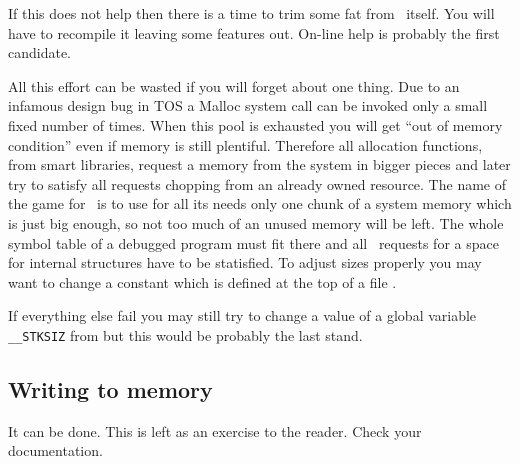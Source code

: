If this does not help then there is a time to trim some fat from
\szadb\ itself. You will have to recompile it leaving some features
out.  On-line help is probably the first candidate.

All this effort can be wasted if you will forget about one thing.
Due to an infamous design bug in TOS a Malloc system call can
be invoked only a small fixed number of times. When this pool is
exhausted you will get ``out of memory condition'' even if memory
is still plentiful.
Therefore all allocation functions, from smart libraries,
request a memory from the system in bigger pieces and later
try to satisfy all requests chopping from an already owned resource.
The name of the game for \szadb\ is to use for all its needs
only one chunk of a system memory which is just big enough, so
not too much of an unused memory will be left.
The whole symbol table of a de\-bug\-ged program must fit there and
all \szadb\ requests for a space for in\-ter\-nal structures have to
be statisfied.
To adjust sizes properly
you may want to change a constant  which is defined
at the top of a file .

If everything else fail you may still try to change a value of
a global variable \verb|__STKSIZ| from  but this
would be probably the last stand.

\subsection{Writing to memory}

It can be done.
This is left as an exercise to the reader.
Check your documentation.

